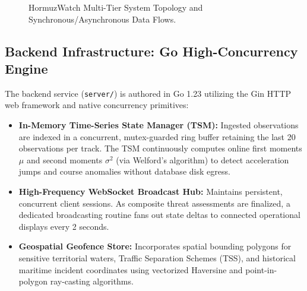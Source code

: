 \begin{figure}[htbp]
\caption{HormuzWatch Multi-Tier System Topology and Synchronous/Asynchronous Data Flows.}
\label{fig:system_arch}
\end{figure}

\subsection{Backend Infrastructure: Go High-Concurrency Engine}
The backend service (\texttt{server/}) is authored in Go 1.23 utilizing the Gin HTTP web framework and native concurrency primitives:
\begin{itemize}[leftmargin=*]
    \item \textbf{In-Memory Time-Series State Manager (TSM):} Ingested observations are indexed in a concurrent, mutex-guarded ring buffer retaining the last 20 observations per track. The TSM continuously computes online first moments $\mu$ and second moments $\sigma^2$ (via Welford's algorithm) to detect acceleration jumps and course anomalies without database disk egress.
    \item \textbf{High-Frequency WebSocket Broadcast Hub:} Maintains persistent, concurrent client sessions. As composite threat assessments are finalized, a dedicated broadcasting routine fans out state deltas to connected operational displays every 2 seconds.
    \item \textbf{Geospatial Geofence Store:} Incorporates spatial bounding polygons for sensitive territorial waters, Traffic Separation Schemes (TSS), and historical maritime incident coordinates using vectorized Haversine and point-in-polygon ray-casting algorithms.
\end{itemize}

